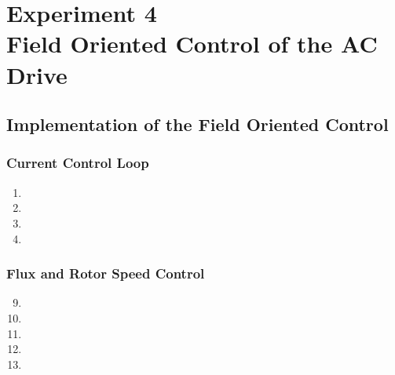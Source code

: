 \documentclass[12pt,a4paper, openany]{book}
\begin{document}




\setcounter{chapter}{3} %
\chapter{Experiment 4 \\   Field Oriented Control of the AC Drive}

 \setcounter{section}{3} %
\section{ Implementation of the Field Oriented Control}
\subsection{ Current Control Loop}
\begin{enumerate}
\item 
\item 
\item 
\item 
\end{enumerate}
\subsection{ Flux and Rotor Speed Control}
\begin{enumerate}
\setcounter{enumi}{8}
\item 
\item 
\item 
\setcounter{enumi}{13}
\item 
\item
\end{enumerate}
\end{document}
